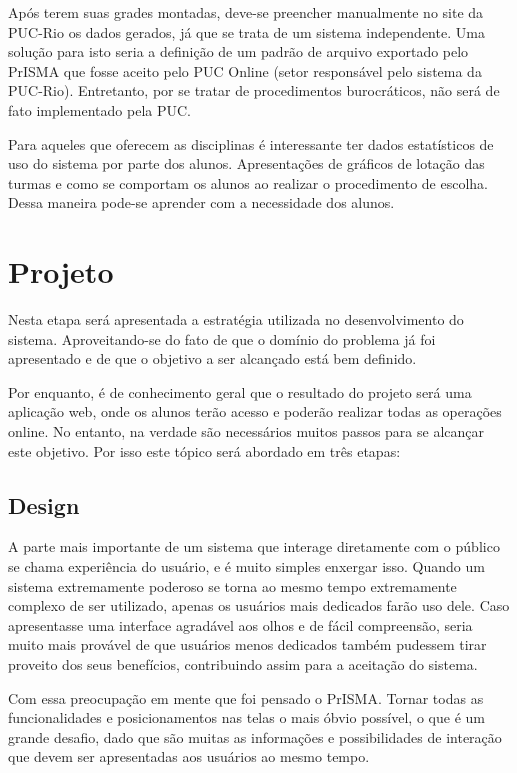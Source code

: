 \documentclass[graduacao,brazil]{ThesisPUC}
\begin{document}
Após terem suas grades montadas, deve-se preencher manualmente no site da PUC-Rio os dados gerados, já que se trata de um sistema independente. Uma solução para isto seria a definição de um padrão de arquivo exportado pelo PrISMA que fosse aceito pelo PUC Online (setor responsável pelo sistema da PUC-Rio). Entretanto, por se tratar de procedimentos burocráticos, não será de fato implementado pela PUC.

Para aqueles que oferecem as disciplinas é interessante ter dados estatísticos de uso do sistema por parte dos alunos. Apresentações de gráficos de lotação das turmas e como se comportam os alunos ao realizar o procedimento de escolha. Dessa maneira pode-se aprender com a necessidade dos alunos.


\chapter{Projeto}

Nesta etapa será apresentada a estratégia utilizada no desenvolvimento do sistema. Aproveitando-se do fato de que o domínio do problema já foi apresentado e de que o objetivo a ser alcançado está bem definido.

Por enquanto, é de conhecimento geral que o resultado do projeto será uma aplicação web, onde os alunos terão acesso e poderão realizar todas as operações online. No entanto, na verdade são necessários muitos passos para se alcançar este objetivo. Por isso este tópico será abordado em três etapas:

\section{Design}

A parte mais importante de um sistema que interage diretamente com o público se chama experiência do usuário, e é muito simples enxergar isso. Quando um sistema extremamente poderoso se torna ao mesmo tempo extremamente complexo de ser utilizado, apenas os usuários mais dedicados farão uso dele. Caso apresentasse uma interface agradável aos olhos e de fácil compreensão, seria muito mais provável de que usuários menos dedicados também pudessem tirar proveito dos seus benefícios, contribuindo assim para a aceitação do sistema.

Com essa preocupação em mente que foi pensado o PrISMA. Tornar todas as funcionalidades e posicionamentos nas telas o mais óbvio possível, o que é um grande desafio, dado que são muitas as informações e possibilidades de interação que devem ser apresentadas aos usuários ao mesmo tempo.
\end{document}
